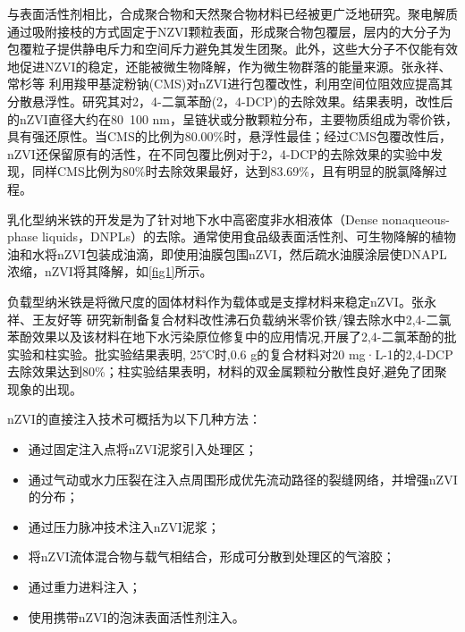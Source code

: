 与表面活性剂相比，合成聚合物和天然聚合物材料已经被更广泛地研究\cite{ZHOU2014155}。聚电解质通过吸附接枝的方式固定于NZVI颗粒表面，形成聚合物包覆层，层内的大分子为包覆粒子提供静电斥力和空间斥力\cite{2018Impact,doi:10.108007388551.2018.1440525}避免其发生团聚。此外，这些大分子不仅能有效地促进NZVI的稳定，还能被微生物降解，作为微生物群落的能量来源。张永祥、常杉等\cite{11} 利用羧甲基淀粉钠(CMS)对nZVI进行包覆改性，利用空间位阻效应提高其分散悬浮性。研究其对2，4-二氯苯酚(2，4-DCP)的去除效果。结果表明，改性后的nZVI直径大约在80~100 nm，呈链状或分散颗粒分布，主要物质组成为零价铁，具有强还原性。当CMS的比例为80.00\%时，悬浮性最佳；经过CMS包覆改性后，nZVI还保留原有的活性，在不同包覆比例对于2，4-DCP的去除效果的实验中发现，同样CMS比例为80\%时去除效果最好，达到83.69\%，且有明显的脱氯降解过程。

乳化型纳米铁的开发是为了针对地下水中高密度非水相液体（Dense nonaqueous-phase liquids，DNPLs）的去除。通常使用食品级表面活性剂、可生物降解的植物油和水将nZVI包装成油滴，即使用油膜包围nZVI，然后疏水油膜涂层使DNAPL浓缩，nZVI将其降解\cite{12}，如\cref{fig1}所示。

负载型纳米铁是将微尺度的固体材料作为载体或是支撑材料来稳定nZVI。张永祥、王友好等\cite{13, 14} 研究新制备复合材料改性沸石负载纳米零价铁/镍去除水中2,4-二氯苯酚效果以及该材料在地下水污染原位修复中的应用情况,开展了2,4-二氯苯酚的批实验和柱实验。批实验结果表明, 25℃时,0.6 g的复合材料对20 mg·L-1的2,4-DCP去除效果达到80\%；柱实验结果表明，材料的双金属颗粒分散性良好,避免了团聚现象的出现。


nZVI的直接注入技术可概括为以下几种方法：

\begin{itemize}
    \item 通过固定注入点将nZVI泥浆引入处理区\cite{17}；
    \item 通过气动或水力压裂在注入点周围形成优先流动路径的裂缝网络，并增强nZVI的分布\cite{18}；
    \item 通过压力脉冲技术注入nZVI泥浆；
    \item 将nZVI流体混合物与载气相结合，形成可分散到处理区的气溶胶\cite{19}；
    \item 通过重力进料注入\cite{20}；
    \item 使用携带nZVI的泡沫表面活性剂注入\cite{21}。
\end{itemize}

